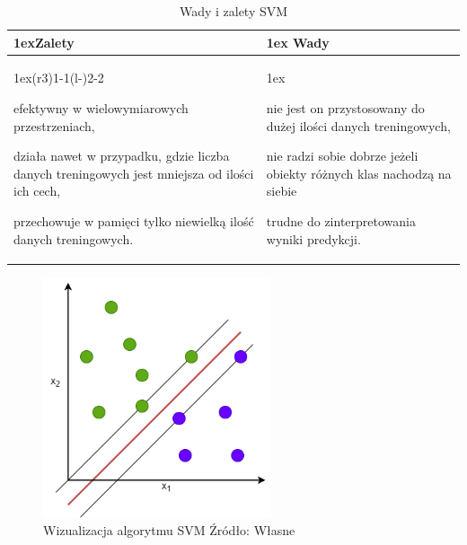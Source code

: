 \begin{table}[h]
    \begin{tabularx}{\linewidth}{>{\parskip1ex}X@{\kern4\tabcolsep}>{\parskip1ex}X}
    \toprule
    \hfil\bfseries Zalety
    &
    \hfil\bfseries Wady
    \\\cmidrule(r{3\tabcolsep}){1-1}\cmidrule(l{-\tabcolsep}){2-2}
    
    efektywny w wielowymiarowych przestrzeniach,\par
    działa nawet w przypadku, gdzie liczba danych treningowych jest mniejsza od
    ilości ich cech,\par
    przechowuje w pamięci tylko niewielką ilość danych treningowych.\par
    
    &
    
    nie jest on przystosowany do dużej ilości danych treningowych,\par
    nie radzi sobie dobrze jeżeli obiekty różnych klas nachodzą na siebie\par
    trudne do zinterpretowania wyniki predykcji.
    
    \\\bottomrule
    \end{tabularx}
    \caption{Wady i zalety SVM}
\end{table}

\begin{figure}[H]
    \centering
    \includegraphics[width=0.6\textwidth]{./Img/SVM.png}
    \caption{Wizualizacja algorytmu SVM Źródło: Własne}
\end{figure}

